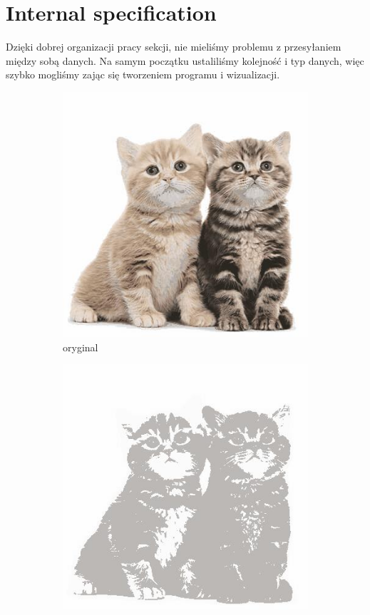 \documentclass[12pt,a4paper]{article}
\begin{document}
\section{Internal specification}
Dzięki dobrej organizacji pracy sekcji, nie mieliśmy problemu z przesyłaniem między sobą danych. Na samym początku ustaliliśmy kolejność i typ danych, więc szybko mogliśmy zając się tworzeniem programu i wizualizacji.
    
\begin{figure}[htb]
    \centering %
\begin{subfigure}{0.25\textwidth}
  \includegraphics[width=\linewidth]{images/big/original}
  \caption{oryginal}
  \label{fig:1}
\end{subfigure}\hfil %
\begin{subfigure}{0.25\textwidth}
  \includegraphics[width=\linewidth]{images/big/3-3-5-05}

\end{subfigure}
\end{figure}
\end{document}
